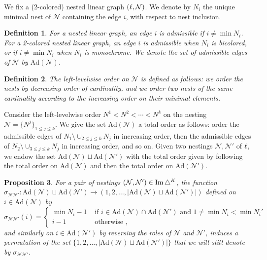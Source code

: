 \documentclass[twoside, 12pt]{amsart}
\newtheorem{definition}{Definition}[section]
\newtheorem{proposition}[definition]{Proposition}
\theoremstyle{remark}
\begin{document}
We fix a (2-colored) nested linear graph $(\ell,\mathcal{N})$.
We denote by $N_i$ the unique minimal nest of $\mathcal{N}$ containing the edge $i$, with respect to nest inclusion. 

\begin{definition}
For a nested linear graph, an edge $i$ is \emph{admissible} if $i \neq \min N_i$. 
For a 2-colored nested linear graph, an edge $i$ is \emph{admissible} when $N_i$ is bicolored, or if $i \neq \min N_i$ when $N_i$ is monochrome.
We denote the set of admissible edges of $\mathcal{N}$ by $\mathrm{Ad}(\mathcal{N})$. 
\end{definition}

\begin{definition} 
\label{def:left-levelwise-graph}
The \emph{left-levelwise order} on $\mathcal{N}$ is defined as follows: we order the nests by decreasing order of cardinality, and we order two nests of the same cardinality according to the increasing order on their minimal elements. 
\end{definition}

Consider the left-levelwise order $N^1<N^2<\cdots < N^k$ on the nesting $\mathcal{N}=\{N^j\}_{1\leq j \leq k}$.
We give the set $\mathrm{Ad}(\mathcal{N})$ a total order as follows: order the admissible edges of $N_1 \setminus \cup_{2\leq j \leq k} N_j$ in increasing order, then the admissible edges of $N_2 \setminus \cup_{3\leq j \leq k} N_j$ in increasing order, and so on. 
Given two nestings $\mathcal{N}, \mathcal{N}'$ of $\ell$, we endow the set $\mathrm{Ad}(\mathcal{N})\sqcup \mathrm{Ad}(\mathcal{N}')$ with the total order given by following the total order on $\mathrm{Ad}(\mathcal{N})$ and then the total order on $\mathrm{Ad}(\mathcal{N}')$. 

\begin{proposition} 
\label{prop:signs-ass}
For a pair of nestings  $(\mathcal{N}, \mathcal{N}')\in \operatorname{Im}\triangle^K$, the function $\sigma_{\mathcal{N}\mathcal{N}'}: \mathrm{Ad}(\mathcal{N})\sqcup \mathrm{Ad}(\mathcal{N}') \to (1,2,\ldots,|\mathrm{Ad}(\mathcal{N})\sqcup \mathrm{Ad}(\mathcal{N}')|)$ defined on $i \in \mathrm{Ad}(\mathcal{N})$ by 
\begin{equation*}
  \sigma_{\mathcal{N}\mathcal{N}'}(i)= 
  \begin{cases}
    \min N_i -1 & \text{ if } i \in \mathrm{Ad}(\mathcal{N})\cap \mathrm{Ad}(\mathcal{N}') \text{ and } 1 \neq \min N_i < \min N_i' \\ 
    i-1 & \text{ otherwise ,} 
  \end{cases}
\end{equation*}
and similarly on $i \in \mathrm{Ad}(\mathcal{N}')$ by reversing the roles of $\mathcal{N}$ and $\mathcal{N}'$, induces a permutation of the set $\{1,2,\ldots,|\mathrm{Ad}(\mathcal{N})\sqcup \mathrm{Ad}(\mathcal{N}')|\}$ that we will still denote by $\sigma_{\mathcal{N}\mathcal{N}'}$.
\end{proposition}
\end{document}
